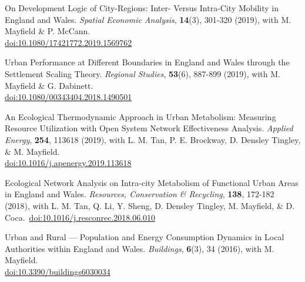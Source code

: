 \documentclass[10pt]{article}
\renewcommand{\section}[1]{\pagebreak[3]%
    \vspace{1.3\baselineskip}%
    \phantomsection\addcontentsline{toc}{section}{#1}%
    \noindent\llap{\large\smash{\parbox[t]{\marginparwidth}{\raggedright #1}}}%
    \vspace{-\baselineskip}\par}
\begin{document}
\begin{etaremune}[leftmargin=0ex, topsep=0ex]
	\item On Development Logic of City-Regions: Inter- Versus Intra-City Mobility in England and Wales. \emph{Spatial Economic Analysis}, \textbf{14}(3), 301-320 (2019), with M. Mayfield \& P. McCann.~\\\href{https://doi.org/10.1080/17421772.2019.1569762}{doi:10.1080/17421772.2019.1569762}
	
	\item Urban Performance at Different Boundaries in England and Wales through the Settlement Scaling Theory. \emph{Regional Studies}, \textbf{53}(6), 887-899 (2019), with M. Mayfield \& G. Dabinett.~\\\href{http://dx.doi.org/10.1080/00343404.2018.1490501}{doi:10.1080/00343404.2018.1490501}

	\item An Ecological Thermodynamic Approach in Urban Metabolism: Measuring Resource Utilization with Open System Network Effectiveness Analysis. \emph{Applied Energy}, \textbf{254}, 113618 (2019), with L. M. Tan, P. E. Brockway, D. Densley Tingley, \& M. Mayfield.~\\\href{https://doi.org/10.1016/j.apenergy.2019.113618}{doi:10.1016/j.apenergy.2019.113618}
			
	\item Ecological Network Analysis on Intra-city Metabolism of Functional Urban Areas in England and Wales. \emph{Resources, Conservation \& Recycling}, \textbf{138}, 172-182 (2018), with L. M. Tan, Q. Li, Y. Sheng, D. Densley Tingley, M. Mayfield, \& D. Coca.~\href{https//doi.org/10.1016/j.resconrec.2018.06.010}{doi:10.1016/j.resconrec.2018.06.010}\label{sure.net}

	\item Urban and Rural --- Population and Energy Consumption Dynamics in Local Authorities within England and Wales. \emph{Buildings}, \textbf{6}(3), 34 (2016), with M. Mayfield.~\\\href{http://dx.doi.org/10.3390/buildings6030034}{doi:10.3390/buildings6030034}
	
\end{etaremune}
\renewcommand{\labelenumi}{R\theenumi.}
\end{document}
